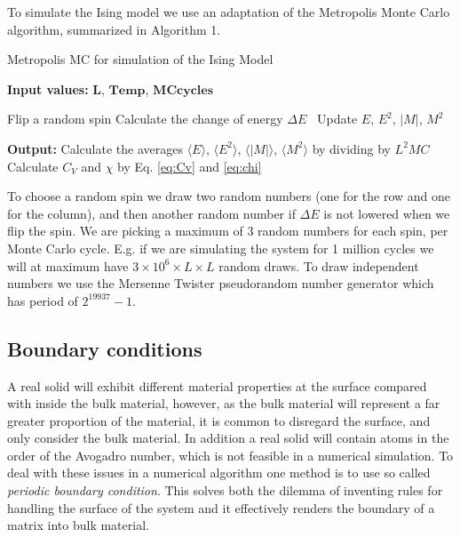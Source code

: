 \documentclass[a4paper]{article}
\begin{document}
To simulate the Ising model we use an adaptation of the Metropolis Monte Carlo algorithm, summarized in Algorithm 1.



\begin{algorithm}[H]
\caption{Metropolis MC for simulation of the Ising Model}\label{algo-VV}
\textbf{Input values:} $\mathbf{L}$, $\mathbf{Temp}$, $\mathbf{MC cycles}$
\begin{algorithmic}[1]
\State Flip a random spin
\State Calculate the change of energy $\Delta E$\
\EndIf
\EndFor
\State Update $E$, $E^2$, $|M|$, $M^2$
\EndFor
\end{algorithmic}
\textbf{Output:} Calculate the averages $\langle E \rangle$, $\langle E^2 \rangle$, $\langle |M| \rangle$, $\langle M^2 \rangle$ by dividing by $L^2MC$\; 
	Calculate $C_V$ and $\chi$ by Eq. \ref{eq:Cv} and \ref{eq:chi}\;
\label{alg-MMC}
\end{algorithm}

To choose a random spin we draw two random numbers (one for the row and one for the column), and then another random number if $\Delta E$ is not lowered when we flip the spin. We are picking a maximum of 3 random numbers for each spin, per Monte Carlo cycle. E.g. if we are simulating the system for 1 million cycles we will at maximum have  $3\times10^6\times L\times L$ random draws. To draw independent numbers we use the Mersenne Twister pseudorandom number generator which has period of $2^{19937}-1$.


\subsection{Boundary conditions}
A real solid will exhibit different material properties at the surface compared with inside the bulk material, however, as the bulk material will represent a far greater proportion of the material, it is common to disregard the surface, and only consider the bulk material. In addition a real solid will contain atoms in the order of the Avogadro number, which is not feasible in a numerical simulation. To deal with these issues in a numerical algorithm one method is to use so called \textit{periodic boundary condition}. This solves both the dilemma of inventing rules for handling the surface of the system and it effectively renders the boundary of a matrix into bulk material. 
\end{document}
